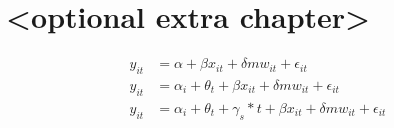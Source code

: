 \section{<optional extra chapter>} \label{chap:spatialheterogeneity}

\begin{align}
    y_{it} &= \alpha + \beta x_{it} + \delta mw_{it} + \epsilon_{it} \label{eq:pols} \\
    y_{it} &= \alpha_i + \theta_t + \beta x_{it} + \delta mw_{it} + \epsilon_{it} \label{eq:2fe} \\
    y_{it} &= \alpha_i + \theta_t + \gamma_s * t + \beta x_{it} + \delta mw_{it} + \epsilon_{it} \label{eq:timeTrends}
\end{align}
